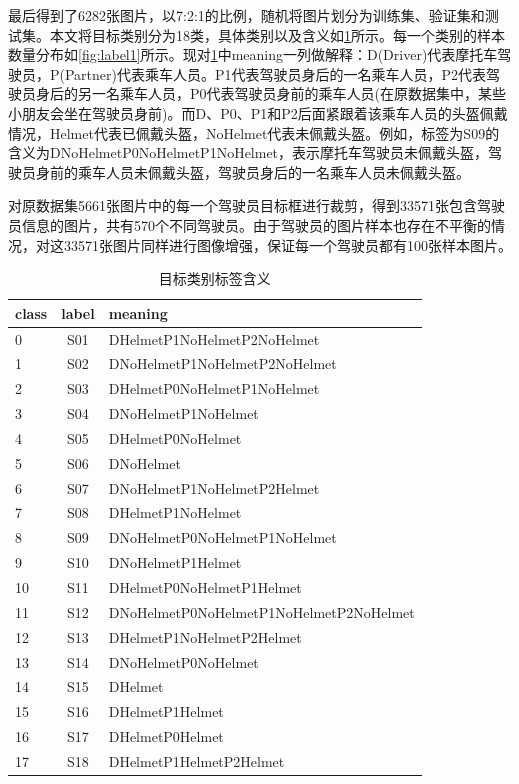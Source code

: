 最后得到了6282张图片，以7:2:1的比例，随机将图片划分为训练集、验证集和测试集。本文将目标类别分为18类，具体类别以及含义如\ref{tab:newlabel}所示。每一个类别的样本数量分布如\ref{fig:label1}所示。现对\ref{tab:newlabel}中meaning一列做解释：D(Driver)代表摩托车驾驶员，P(Partner)代表乘车人员。P1代表驾驶员身后的一名乘车人员，P2代表驾驶员身后的另一名乘车人员，P0代表驾驶员身前的乘车人员(在原数据集中，某些小朋友会坐在驾驶员身前)。而D、P0、P1和P2后面紧跟着该乘车人员的头盔佩戴情况，Helmet代表已佩戴头盔，NoHelmet代表未佩戴头盔。例如，标签为S09的含义为DNoHelmetP0NoHelmetP1NoHelmet，表示摩托车驾驶员未佩戴头盔，驾驶员身前的乘车人员未佩戴头盔，驾驶员身后的一名乘车人员未佩戴头盔。

对原数据集5661张图片中的每一个驾驶员目标框进行裁剪，得到33571张包含驾驶员信息的图片，共有570个不同驾驶员。由于驾驶员的图片样本也存在不平衡的情况，对这33571张图片同样进行图像增强，保证每一个驾驶员都有100张样本图片。

\begin{table}[htb]
      \centering
      \caption[标签解释]{目标类别标签含义\label{tab:newlabel}}
      \begin{tabular}{lcl}
          \toprule
          \multicolumn{1}{c}{class} & \multicolumn{1}{c}{label} & \multicolumn{1}{l}{meaning} \\
          \midrule
          0 & S01 & DHelmetP1NoHelmetP2NoHelmet \\
          1 & S02 & DNoHelmetP1NoHelmetP2NoHelmet \\
          2 & S03 & DHelmetP0NoHelmetP1NoHelmet \\
          3 & S04 & DNoHelmetP1NoHelmet \\
          4 & S05 & DHelmetP0NoHelmet \\
          5 & S06 & DNoHelmet \\
          6 & S07 & DNoHelmetP1NoHelmetP2Helmet \\
          7 & S08 & DHelmetP1NoHelmet \\
          8 & S09 & DNoHelmetP0NoHelmetP1NoHelmet \\
          9 & S10 & DNoHelmetP1Helmet \\
          10 & S11 &  DHelmetP0NoHelmetP1Helmet \\
          11 & S12 &  DNoHelmetP0NoHelmetP1NoHelmetP2NoHelmet \\
          12 & S13 &  DHelmetP1NoHelmetP2Helmet \\
          13 & S14 &  DNoHelmetP0NoHelmet \\
          14 & S15 &  DHelmet \\
          15 & S16 &  DHelmetP1Helmet \\
          16 & S17 &  DHelmetP0Helmet \\
          17 & S18 &  DHelmetP1HelmetP2Helmet \\
          \bottomrule
      \end{tabular}
\end{table}



